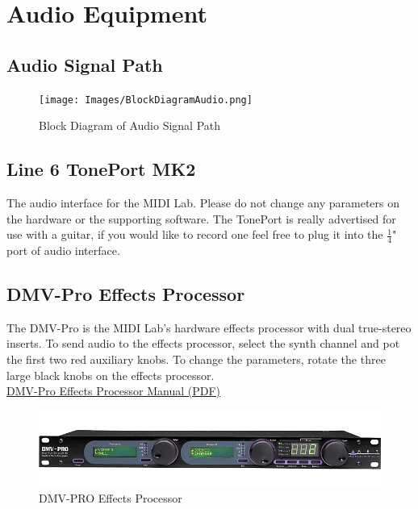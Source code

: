 \section{Audio Equipment}
\subsection{Audio Signal Path}

\begin{figure}[h]
\centering
\texttt{[image: Images/BlockDiagramAudio.png]}
\caption{Block Diagram of Audio Signal Path}
\label{fig:fullfig}
\end{figure}

\subsection{Line 6 TonePort MK2}

The audio interface for the MIDI Lab. Please do not change any parameters on the hardware or the supporting software. The TonePort is really advertised for use with a guitar, if you would like to record one feel free to plug it into the $\frac{1}{4}$" port of audio interface.

\subsection{DMV-Pro Effects Processor}

The DMV-Pro is the MIDI Lab's hardware effects processor with dual true-stereo inserts. To send audio to the effects processor, select the synth channel and pot the first two red auxiliary knobs. To change the parameters, rotate the three large black knobs on the effects processor.\\
\linebreak
\href{https://github.com/dkadyrov/MIDILab/blob/master/Manuals/DMV_Pro.pdf}{DMV-Pro Effects Processor Manual (PDF)}

\begin{figure}[h]
\centering
\includegraphics[width=.85\textwidth]{Images/DMVPRO.jpg}
\caption{DMV-PRO Effects Processor}
\label{fig:fullfig}
\end{figure}

\newpage

